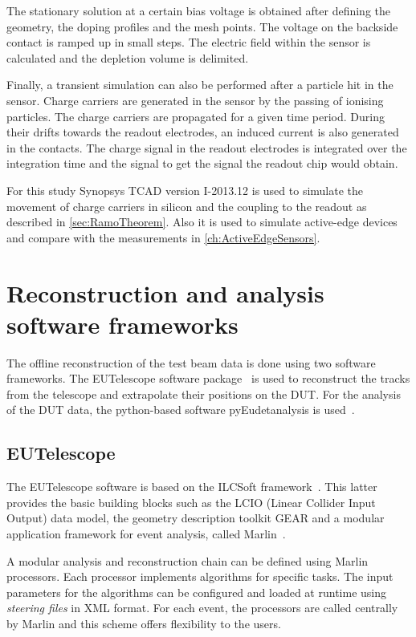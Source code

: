 The stationary solution at a certain bias voltage is obtained after
defining the geometry, the doping profiles and the mesh points. The
voltage on the backside contact is ramped up in small steps. The
electric field within the sensor is calculated and the depletion
volume is delimited.

Finally, a transient simulation can also be performed after a particle
hit in the sensor. Charge carriers are generated in the sensor by the
passing of ionising particles. The charge carriers are propagated for
a given time period. During their drifts towards the readout
electrodes, an induced current is also generated in the contacts. The
charge signal in the readout electrodes is integrated over the
integration time and the signal to get the signal the readout chip
would obtain.

For this study Synopsys TCAD version I-2013.12 is used to simulate the
movement of charge carriers in silicon and the coupling to the readout
as described in \cref{sec:RamoTheorem}. Also it is used to simulate
active-edge devices and compare with the measurements in
\cref{ch:ActiveEdgeSensors}.

\section{Reconstruction and analysis software frameworks}
\label{sec:recoSoft}

The offline reconstruction of the test beam data is done using two
software frameworks. The EUTelescope software
package~\cite{Rubinskiy,EutelescopeWebsite} is used to reconstruct the
tracks from the telescope and extrapolate their positions on the
DUT. For the analysis of the DUT data, the python-based software
pyEudetanalysis is used~\cite{pyeudet}.

\subsection{EUTelescope}
\label{sec:EUTelescope}
The EUTelescope software is based on the ILCSoft
framework~\cite{Aplin:2009zz}. This latter provides the basic building
blocks such as the LCIO (Linear Collider Input Output) data model, the
geometry description toolkit GEAR and a modular application framework
for event analysis, called Marlin~\cite{Gaede:2006pj}.

A modular analysis and reconstruction chain can be defined using
Marlin processors. Each processor implements algorithms for specific
tasks. The input parameters for the algorithms can be configured and
loaded at runtime using \textit{steering files} in XML format. For
each event, the processors are called centrally by Marlin and this
scheme offers flexibility to the users.

